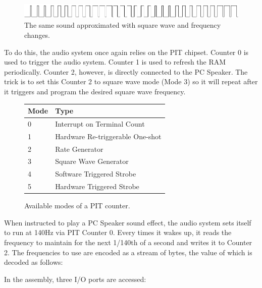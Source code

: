 \par
\begin{figure}[H]
\centering
 \includegraphics[width=\textwidth]{imgs/drawings/pwm/pwm_approximation.png}
 \caption{The same sound approximated with square wave and frequency changes.}
 \end{figure}
\par

To do this, the audio system once again relies on the PIT chipset. Counter 0 is used to trigger the audio system. Counter 1 is used to refresh the RAM periodically. Counter 2, however, is directly connected to the PC Speaker. The trick is to set this Counter 2 to square wave mode (Mode 3) so it will repeat after it triggers and program the desired square wave frequency. \\
\par
\begin{figure}[H]
\centering
   \begin{tabularx}{\textwidth}{ X X  }
	  \toprule
	  \textbf{Mode} & \textbf{Type} \\ \bottomrule
	    0 & Interrupt on Terminal Count\\
		1 & Hardware Re-triggerable One-shot\\
		2 & Rate Generator\\
		3 & Square Wave Generator\\
		4 & Software Triggered Strobe\\
		5 & Hardware Triggered Strobe\\
	  \bottomrule
  \end{tabularx}
  \caption{Available modes of a PIT counter.}
\end{figure}
\par 
When instructed to play a PC Speaker sound effect, the audio system sets itself to run at 140Hz via PIT Counter 0. Every times it wakes up, it reads the frequency to maintain for the next 1/140th of a second and writes it to Counter 2. The frequencies to use are encoded as a stream of bytes, the value of which is decoded as follows:\\
\par 
\begin{minipage}{\textwidth}

\end{minipage}
\par
In the assembly, three I/O ports are accessed:\\
\par
\begin{minipage}{\textwidth}

\end{minipage}
\par

